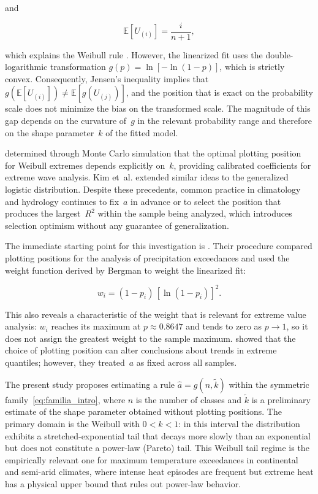 \documentclass[APA,STIX1COL]{WileyNJD-v2}
\begin{document}
and

\begin{equation}
    \mathbb{E}[U_{(i)}]=\frac{i}{n+1},
\end{equation}

\medskip

which explains the Weibull rule \citep{makkonen2014}. However, the
linearized fit uses the double-logarithmic transformation
$g(p)=\ln[-\ln(1-p)]$, which is strictly convex. Consequently,
Jensen's inequality implies that $g(\mathbb{E}[U_{(i)}])\neq
\mathbb{E}[g(U_{(j)})]$, and the position that is exact on the
probability scale does not minimize the bias on the transformed
scale. The magnitude of this gap depends on the curvature of~$g$
in the relevant probability range and therefore on the shape
parameter~$k$ of the fitted model.

\citet{goda1988,goda2010} determined through Monte Carlo simulation
that the optimal plotting position for Weibull extremes depends
explicitly on~$k$, providing calibrated coefficients for extreme
wave analysis. Kim et~al. \citeyearpar{kim2012,kim2015} extended
similar ideas to the generalized logistic distribution. Despite
these precedents, common practice in climatology and hydrology
continues to fix~$a$ in advance or to select the position that
produces the largest~$R^2$ within the sample being analyzed, which
introduces selection optimism without any guarantee of
generalization.

The immediate starting point for this investigation is
\citet{olivera2019}. Their procedure compared plotting positions
for the analysis of precipitation exceedances and used the weight
function derived by Bergman \citeyearpar{bergman1986} to weight
the linearized fit:

\begin{equation}\label{eq:bergman_intro}
w_i = (1 - p_i)\,[\ln(1-p_i)]^2.
\end{equation}

\medskip

This also reveals a characteristic of the weight that is relevant
for extreme value analysis: $w_i$ reaches its maximum at
$p\approx 0.8647$ and tends to zero as $p\to 1$, so it does not
assign the greatest weight to the sample maximum.
\citet{olivera2019} showed that the choice of plotting position
can alter conclusions about trends in extreme quantiles; however,
they treated~$a$ as fixed across all samples.

The present study proposes estimating a rule
$\hat{a}=g(n,\tilde{k})$ within the symmetric
family~\eqref{eq:familia_intro}, where $n$ is the number of
classes and $\tilde{k}$ is a preliminary estimate of the shape
parameter obtained without plotting positions. The primary domain
is the Weibull with $0<k<1$: in this interval the distribution
exhibits a stretched-exponential tail that decays more slowly than
an exponential but does not constitute a power-law (Pareto) tail.
This Weibull tail regime \citep{gardes2005,diebolt2008} is the
empirically relevant one for maximum temperature exceedances in
continental and semi-arid climates, where intense heat episodes
are frequent but extreme heat has a physical upper bound that
rules out power-law behavior.
\end{document}
